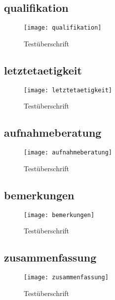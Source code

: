 \begin{landscape}
\subsection{qualifikation}
\begin{figure}[H]
    \centering
    \caption{Testüberschrift}
    \begin{adjustbox}{width=\linewidth, center}
        \texttt{[image: qualifikation]}
    \end{adjustbox}
\end{figure}

\subsection{letztetaetigkeit}
\begin{figure}[H]
    \centering
    \caption{Testüberschrift}
    \begin{adjustbox}{width=\linewidth, center}
        \texttt{[image: letztetaetigkeit]}
    \end{adjustbox}
\end{figure}

\subsection{aufnahmeberatung}
\begin{figure}[H]
    \centering
    \caption{Testüberschrift}
    \begin{adjustbox}{width=\linewidth, center}
        \texttt{[image: aufnahmeberatung]}
    \end{adjustbox}
\end{figure}

\subsection{bemerkungen}
\begin{figure}[H]
    \centering
    \caption{Testüberschrift}
    \begin{adjustbox}{width=\linewidth, center}
        \texttt{[image: bemerkungen]}
    \end{adjustbox}
\end{figure}

\subsection{zusammenfassung}
\begin{figure}[H]
    \centering
    \caption{Testüberschrift}
    \begin{adjustbox}{width=\linewidth, center}
        \texttt{[image: zusammenfassung]}
    \end{adjustbox}
\end{figure}


\end{landscape}
